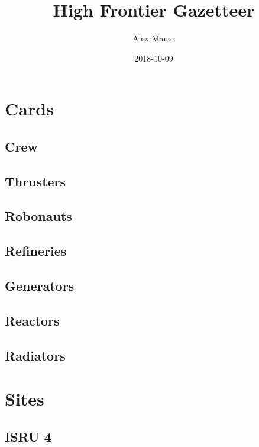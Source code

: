 \documentclass[a4paper,table,fontsize=8pt,DIV=6,enabledeprecatedfontcommands]{scrbook}
\title{High Frontier Gazetteer}
\author{Alex Mauer}
\date{2018-10-09}
\begin{document}
\maketitle

\section{Cards}
\subsection{Crew}
\renewcommand{\arraystretch}{1.25}

\subsection{Thrusters}

\subsection{Robonauts}
\restoregeometry

\subsection{Refineries}

\subsection{Generators}

\subsection{Reactors}

\subsection{Radiators}

\section{Sites}

\subsection{ISRU 4}
\end{document}
